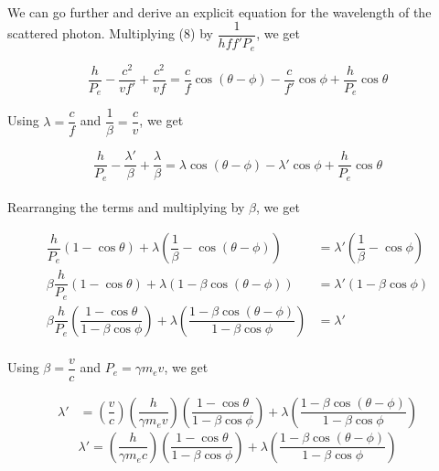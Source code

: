 \documentclass{article}
\begin{document}
\noindent \\ We can go further and derive an explicit equation for the wavelength of the scattered photon. Multiplying (8) by $\dfrac{1}{hff'P_e}$, we get

\begin{equation*}
\dfrac{h}{P_e} - \dfrac{c^2}{vf'} + \dfrac{c^2}{vf} = \dfrac{c}{f}\cos(\theta - \phi) - \dfrac{c}{f'}\cos\phi + \dfrac{h}{P_e}\cos\theta
\end{equation*}

\noindent Using $\lambda = \dfrac{c}{f}$ and $\dfrac{1}{\beta} = \dfrac{c}{v}$, we get

\begin{equation*}
\dfrac{h}{P_e} - \dfrac{\lambda'}{\beta} + \dfrac{\lambda}{\beta} = \lambda\cos(\theta - \phi) - \lambda'\cos\phi + \dfrac{h}{P_e}\cos\theta
\end{equation*}\\

\noindent Rearranging the terms and multiplying by $\beta$, we get

\begin{align*}
\dfrac{h}{P_e}(1 - \cos\theta) + \lambda\left(\dfrac{1}{\beta} - \cos(\theta - \phi)\right) &= \lambda'\left(\dfrac{1}{\beta} - \cos\phi\right)\\
\beta\dfrac{h}{P_e}(1 - \cos\theta) + \lambda\left(1 - \beta\cos(\theta - \phi)\right) &= \lambda'\left(1 - \beta\cos\phi\right)\\
\beta\dfrac{h}{P_e}\left(\dfrac{1 - \cos\theta}{1 - \beta\cos\phi}\right) + \lambda\left(\dfrac{1 - \beta\cos(\theta - \phi)}{1 - \beta\cos\phi}\right) &= \lambda'\\
\end{align*}

\noindent Using $\beta = \dfrac{v}{c}$ and $P_e = \gamma m_ev$, we get

\begin{align*}
\lambda' &= \left(\dfrac{v}{c}\right)\left(\dfrac{h}{\gamma m_ev}\right)\left(\dfrac{1 - \cos\theta}{1 - \beta\cos\phi}\right) + \lambda\left(\dfrac{1 - \beta\cos(\theta - \phi)}{1 - \beta\cos\phi}\right)
\end{align*}
\begin{equation}
\lambda' = \left(\dfrac{h}{\gamma m_ec}\right)\left(\dfrac{1 - \cos\theta}{1 - \beta\cos\phi}\right) + \lambda\left(\dfrac{1 - \beta\cos(\theta - \phi)}{1 - \beta\cos\phi}\right)
\end{equation} \\
\end{document}

